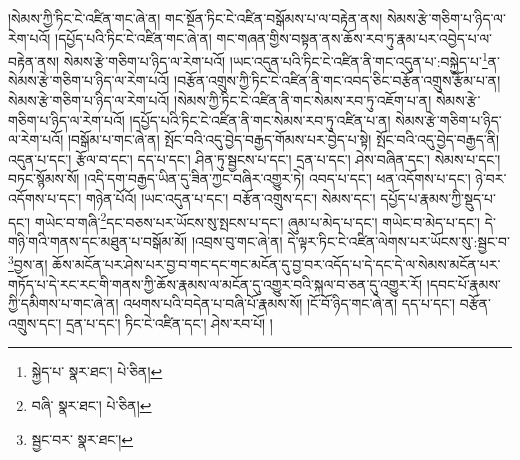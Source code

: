 །སེམས་ཀྱི་ཏིང་ངེ་འཛིན་གང་ཞེ་ན། གང་སྔོན་ཏིང་ངེ་འཛིན་བསྒོམས་པ་ལ་བརྟེན་ནས། སེམས་རྩེ་གཅིག་པ་ཉིད་ལ་རེག་པའོ། །དཔྱོད་པའི་ཏིང་ངེ་འཛིན་གང་ཞེ་ན། གང་གཞན་གྱིས་བསྟན་ནས་ཆོས་རབ་ཏུ་རྣམ་པར་འབྱེད་པ་ལ་བརྟེན་ནས། སེམས་རྩེ་གཅིག་པ་ཉིད་ལ་རེག་པའོ། །ཡང་འདུན་པའི་ཏིང་ངེ་འཛིན་ནི་གང་འདུན་པ་:བསྐྱེད་པ་\footnote{སྐྱེད་པ་  སྣར་ཐང་།  པེ་ཅིན། }ན་སེམས་རྩེ་གཅིག་པ་ཉིད་ལ་རེག་པའོ། །བརྩོན་འགྲུས་ཀྱི་ཏིང་ངེ་འཛིན་ནི་གང་འབད་ཅིང་བརྩོན་འགྲུས་རྩོམ་པ་ན། སེམས་རྩེ་གཅིག་པ་ཉིད་ལ་རེག་པའོ། །སེམས་ཀྱི་ཏིང་ངེ་འཛིན་ནི་གང་སེམས་རབ་ཏུ་འཇོག་པ་ན། སེམས་རྩེ་གཅིག་པ་ཉིད་ལ་རེག་པའོ། །དཔྱོད་པའི་ཏིང་ངེ་འཛིན་ནི་གང་སེམས་རབ་ཏུ་འཛིན་པ་ན། སེམས་རྩེ་གཅིག་པ་ཉིད་ལ་རེག་པའོ། །བསྒོམ་པ་གང་ཞེ་ན། སྤོང་བའི་འདུ་བྱེད་བརྒྱད་གོམས་པར་བྱེད་པ་སྟེ། སྤོང་བའི་འདུ་བྱེད་བརྒྱད་ནི། འདུན་པ་དང་། རྩོལ་བ་དང་། དད་པ་དང་། ཤིན་ཏུ་སྦྱངས་པ་དང་། དྲན་པ་དང་། ཤེས་བཞིན་དང་། སེམས་པ་དང་། བཏང་སྙོམས་སོ། །འདི་དག་བརྒྱད་ཡིན་དུ་ཟིན་ཀྱང་བཞིར་འགྱུར་ཏེ། འབད་པ་དང་། ཕན་འདོགས་པ་དང་། ཉེ་བར་འདོགས་པ་དང་། གཉེན་པོའོ། །ཡང་འདུན་པ་དང་། བརྩོན་འགྲུས་དང་། སེམས་དང་། དཔྱོད་པ་རྣམས་ཀྱི་སྡུད་པ་དང་། གཡེང་བ་གཞི་\footnote{བཞི་  སྣར་ཐང་།  པེ་ཅིན། }དང་བཅས་པར་ཡོངས་སུ་སྤངས་པ་དང་། ཞུམ་པ་མེད་པ་དང་། གཡེང་བ་མེད་པ་དང་། དེ་གཉི་གའི་གནས་དང་མཐུན་པ་བསྒོམ་མོ། །འབྲས་བུ་གང་ཞེ་ན། དེ་ལྟར་ཏིང་ངེ་འཛིན་ལེགས་པར་ཡོངས་སུ་:སྦྱང་བ་\footnote{སྦྱང་བར་  སྣར་ཐང་། }བྱས་ན། ཆོས་མངོན་པར་ཤེས་པར་བྱ་བ་གང་དང་གང་མངོན་དུ་བྱ་བར་འདོད་པ་དེ་དང་དེ་ལ་སེམས་མངོན་པར་གཏོད་པ་དེ་རང་རང་གི་གནས་ཀྱི་ཆོས་རྣམས་ལ་མངོན་དུ་འགྱུར་བའི་སྐལ་བ་ཅན་དུ་འགྱུར་རོ། །དབང་པོ་རྣམས་ཀྱི་དམིགས་པ་གང་ཞེ་ན། འཕགས་པའི་བདེན་པ་བཞི་པོ་རྣམས་སོ། །ངོ་བོ་ཉིད་གང་ཞེ་ན། དད་པ་དང་། བརྩོན་འགྲུས་དང་། དྲན་པ་དང་། ཏིང་ངེ་འཛིན་དང་། ཤེས་རབ་པོ། །
